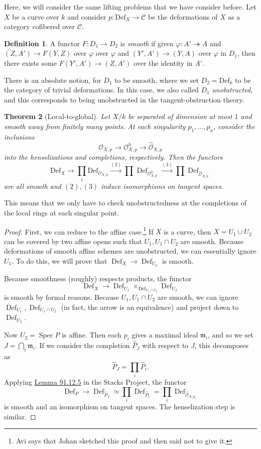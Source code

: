 \documentclass[leqno, openany]{memoir}
\newtheorem{thm}{Theorem}[section]
\theoremstyle{definition}
\newtheorem{defn}[thm]{Definition}
\theoremstyle{remark}
\theoremstyle{plain}
\theoremstyle{definition}
\theoremstyle{remark}
\newcommand{\mc}[1]{\mathcal{#1}}
\newcommand{\mf}[1]{\mathfrak{#1}}
\newcommand{\mr}[1]{\mathrm{#1}}
\newcommand{\wh}[1]{\widehat{#1}}
\DeclareMathOperator{\Def}{Def}
\DeclareMathOperator{\Spec}{Spec}
\begin{document}
Here, we will consider the same lifting problems that we have consider before. Let $X$ be a curve over $k$ and consider $p \colon \mr{Def}_X \to \mc{C}$ be the deformations of $X$ as a category cofibered over $\mc{C}$. 

\begin{defn}
    A functor $F \colon D_1 \to D_2$ is \textit{smooth} if given $\varphi \colon A' \twoheadrightarrow A$ and $(Z, A') \to F(Y, Z)$ over $\varphi$ over $\varphi$ and $(Y', A') \to (Y, A)$ over $\varphi$ in $D_1$, then there exists some $F(Y', A') \to (Z, A')$ over the identity in $A'$.
\end{defn}

There is an absolute notion, for $D_1$ to be smooth, where we set $D_2 = \mr{Def}_k$ to be the category of trivial deformations. In this case, we also called $D_1$ \textit{unobstructed}, and this corresponds to being unobstructed in the tangent-obstruction theory.

\begin{thm}[Local-to-global]
    Let $X/k$ be separated of dimension at most $1$ and smooth away from finitely many points. At each singularity $p_1, \ldots, p_n$, consider the inclusions
    \[ \mc{O}_{X,p} \to \mc{O}_{X,p}^h \to \wh{\mc{O}}_{X,p} \]
    into the henselizations and completions, respectively. Then the functors
    \[ \mr{Def}_X \to \prod_i \mr{Def}_{\mc{O}_{X,p}} \xrightarrow{(2)} \prod \Def_{\mc{O}_{X,p}^h} \xrightarrow{(3)} \prod \Def_{\wh{\mc{O}}_{X,p}} \]
    are all smooth and $(2), (3)$ induce isomorphisms on tangent spaces.
\end{thm}

This means that we only have to check unobstructedness at the completions of the local rings at each singular point.

\begin{proof}
    First, we can reduce to the affine case.\footnote{Avi says that Johan sketched this proof and then said not to give it.} If $X$ is a curve, then $X = U_1 \cup U_2$ can be covered by two affine opens such that $U_1, U_1 \cap U_2$ are smooth. Because deformations of smooth affine schemes are unobstructed, we can essentially ignore $U_1$. To do this, we will prove that $\Def_X \to \Def_{U_2}$ is smooth.

    Because smoothness (roughly) respects products, the functor
    \[ \Def_X \to \Def_{U_1} \times_{\Def_{U_1 \cap U_2}} \Def_{U_2} \]
    is smooth by formal reasons. Because $U_1, U_1 \cap U_2$ are smooth, we can ignore $\Def_{U_1}, \Def_{U_1 \cap U_2}$ (in fact, the arrow is an equivalence) and project down to $\Def_{U_2}$.

    Now $U_2 = \Spec P$ is affine. Then each $p_i$ gives a maximal ideal $\mf{m}_i$, and so we set $J = \bigcap_i \mf{m}_i$. If we consider the completion $\wh{P}_J$ with respect to $J$, this decomposes as
    \[ \wh{P}_J = \prod_i \wh{P}_i. \]
    Applying \href{https://stacks.math.columbia.edu/tag/0DZ5}{Lemma 91.12.5} in the Stacks Project, the functor
    \[ \Def_P \to \Def_{\wh{P}_J} \simeq \prod_i \Def_{\wh{P}_i} = \prod_i \Def_{\wh{\mc{O}}_{X,p_i}} \]
    is smooth and an isomorphism on tangent spaces. The henselization step is similar.
\end{proof}
\end{document}
